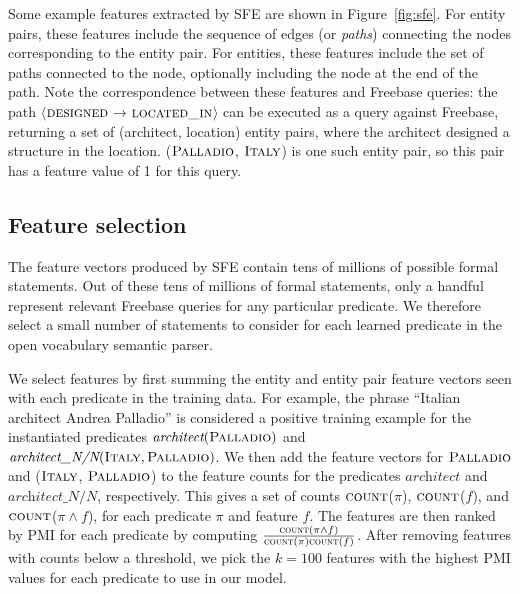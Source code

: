 \documentclass[11pt,letterpaper]{article}
\newcommand{\figref}[1]{Figure~\ref{fig:#1}}
\newcommand{\lexicalpredicate}[1]{\ensuremath{\textit{#1}}}
\newcommand{\formalpredicate}[1]{{\small \ensuremath{\textsc{#1}}}}
\newcommand{\entity}[1]{\ensuremath{\textsc{#1}}}
\newcommand{\pathstart}{\ensuremath{\langle}}
\newcommand{\pathend}{\ensuremath{\rangle}}
\begin{document}
Some example features extracted by SFE are shown in \figref{sfe}.  For entity
pairs, these features include the sequence of edges (or \emph{paths})
connecting the nodes corresponding to the entity pair.  For entities, these
features include the set of paths connected to the node, optionally including
the node at the end of the path.
Note the correspondence between these features and Freebase queries: the path
\pathstart\formalpredicate{designed}$\rightarrow$\formalpredicate{located\_in}\pathend{}
can be executed as a query against Freebase, returning a set of (architect,
location) entity pairs, where the architect designed a structure in the
location. (\entity{Palladio}, \entity{Italy}) is one such entity pair, so this
pair has a feature value of 1 for this query.

\subsection{Feature selection}
\label{sec:feature-selection}

The feature vectors produced by SFE contain tens of millions of possible formal
statements.  Out of these tens of millions of formal statements, only a handful
represent relevant Freebase queries for any particular predicate.  We therefore
select a small number of statements to consider for each learned predicate in
the open vocabulary semantic parser.

We select features by first summing the entity and entity pair feature vectors
seen with each predicate in the training data. For example, the phrase
``Italian architect Andrea Palladio'' is considered a positive training example
for the instantiated predicates
$\lexicalpredicate{architect}(\entity{Palladio})$ and
$\lexicalpredicate{architect\_N/N}(\entity{Italy}, \entity{Palladio})$.  We then
add the feature vectors for \entity{Palladio} and (\entity{Italy},
\entity{Palladio}) to the feature counts for the predicates
\lexicalpredicate{architect} and \lexicalpredicate{architect\_N/N}, respectively.
This gives a set of counts \formalpredicate{count}($\pi$),
\formalpredicate{count}($f$), and \formalpredicate{count}($\pi\land f$), for
each predicate $\pi$ and feature $f$.  The features are then ranked by PMI for
each predicate by computing $\frac{\formalpredicate{count}(\pi\land
f)}{\formalpredicate{count}(\pi)\formalpredicate{count}(f)}$.  After removing
features with counts below a threshold, we pick the $k=100$ features with the
highest PMI values for each predicate to use in our model.
\end{document}
